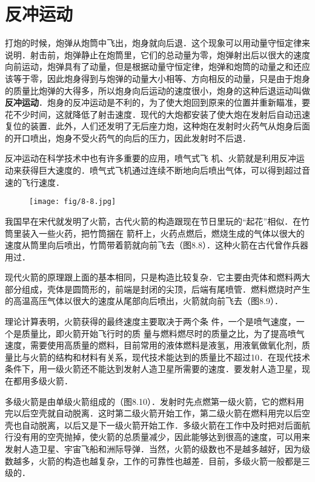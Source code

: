 \section{反冲运动}
打炮的时候，炮弹从炮筒中飞出，炮身就向后退．这个现象可以用动量守恒定律来说明．射击前，炮弹静止在炮筒里，它们的总动量为零，炮弹射出后以很大的速度向前运动，炮弹具有了动量，但是根据动量守恒定律，炮弹和炮筒的动量之和还应该等于零，因此炮身得到与炮弹的动量大小相等、方向相反的动量，只是由于炮身的质量比炮弹的大得多，所以炮身向后运动的速度很小，炮身的这种后退运动叫做\textbf{反冲运动}．炮身的反冲运动是不利的，为了使大炮回到原来的位置并重新瞄准，要花不少时间，这就降低了射击速度．现代的大炮都安装了使大炮在发射后自动迅速复位的装置．此外，人们还发明了无后座力炮，这种炮在发射时火药气从炮身后面的开口喷出，炮身不受火药气的向后的压力，因此发射时不后退．

反冲运动在科学技术中也有许多重要的应用，喷气式飞
机、火箭就是利用反冲运动来获得巨大速度的．喷气式飞机通过连续不断地向后喷出气体，可以得到超过音速的飞行速度．
\begin{figure}[htp]\centering
\texttt{[image: fig/8-8.jpg]}
\caption{}
\end{figure}

我国早在宋代就发明了火箭，古代火箭的构造跟现在节日里玩的“起花”相似．在竹筒里装入一些火药，把竹筒捆在
箭杆上，火药点燃后，燃烧生成的气体以很大的速度从筒里向后喷出，竹筒带着箭就向前飞去（图8.8）．这种火箭在古代曾作兵器用过．

现代火箭的原理跟上面的基本相同，只是构造比较复杂．它主要由壳体和燃料两大部分组成，壳体是圆筒形的，前端是封闭的尖顶，后端有尾喷管．燃料燃烧时产生的高温高压气体以很大的速度从尾部向后喷出，火箭就向前飞去（图8.9）．

理论计算表明，火箭获得的最终速度主要取决于两个条
件，一个是喷气速度，一个是质量比，即火箭开始飞行时的质
量与燃料燃尽时的质量之比，为了提高喷气速度，需要使用高质量的燃料，目前常用的液体燃料是液氢，用液氧做氧化剂，质量比与火箭的结构和材料有关系，现代技术能达到的质量比不超过10．在现代技术条件下，用一级火箭还不能达到发射人造卫星所需要的速度．要发射人造卫星，现在都用多级火箭．

多级火箭是由单级火箭组成的（图8.10）．发射时先点燃第一级火箭，它的燃料用完以后空壳就自动脱离．这时第二级火箭开始工作，第二级火箭在燃料用完以后空壳也自动脱离，以后又是下一级火箭开始工作．多级火箭在工作中及时把对后面航行没有用的空壳抛掉，使火箭的总质量减少，因此能够达到很高的速度，可以用来发射人造卫星、宇宙飞船和洲际导弹．当然，火箭的级数也不是越多越好，因为级数越多，火箭的构造也越复杂，工作的可靠性也越差．目前，多级火箭一般都是三级的．

